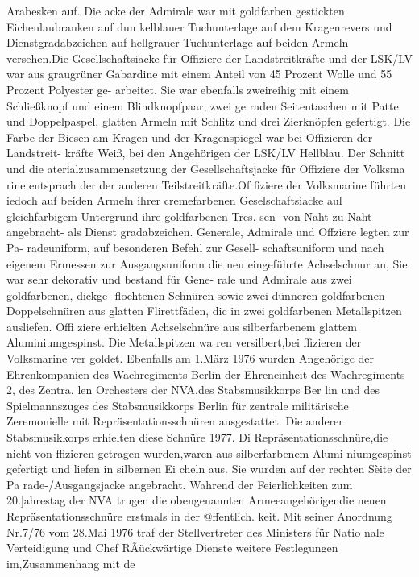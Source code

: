 Arabesken auf. Die acke der Admirale war mit
goldfarben gestickten Eichenlaubranken auf dun
kelblauer Tuchunterlage auf dem Kragenrevers und
Dienstgradabzeichen auf hellgrauer Tuchunterlage
auf beiden Armeln versehen.Die Gesellschaftsiacke
für Offiziere der Landstreitkräfte und der LSK/LV
war aus graugrüner Gabardine mit einem Anteil
von 45 Prozent Wolle und 55 Prozent Polyester ge-
arbeitet. Sie war ebenfalls zweireihig mit einem
Schließknopf und einem Blindknopfpaar, zwei ge
raden Seitentaschen mit Patte und Doppelpaspel,
glatten Armeln mit Schlitz und drei Zierknöpfen
gefertigt. Die Farbe der Biesen am Kragen und der
Kragenspiegel war bei Offizieren der Landstreit-
kräfte Weiß, bei den Angehörigen der LSK/LV
Hellblau.
Der Schnitt und die aterialzusammensetzung
der Gesellschaftsjacke für Offiziere der Volksma
rine entsprach der der anderen Teilstreitkräfte.Of
fiziere der Volksmarine führten iedoch auf beiden
Armeln ihrer cremefarbenen Geselschaftsiacke aul
gleichfarbigem Untergrund ihre goldfarbenen Tres.
sen -von Naht zu Naht angebracht- als Dienst
gradabzeichen.
Generale, Admirale und Offziere legten zur Pa-
radeuniform, auf besonderen Befehl zur Gesell-
schaftsuniform und nach eigenem Ermessen zur
Ausgangsuniform die neu eingeführte Achselschnur
an, Sie war sehr dekorativ und bestand für Gene-
rale und Admirale aus zwei goldfarbenen, dickge-
flochtenen Schnüren sowie zwei dünneren goldfarbenen Doppelschnüren aus glatten Flirettfäden, dic
in zwei goldfarbenen Metallspitzen ausliefen. Offi
ziere erhielten Achselschnüre aus silberfarbenem
glattem Aluminiumgespinst. Die Metallspitzen wa
ren versilbert,bei ffizieren der Volksmarine ver
goldet.
Ebenfalls am 1.März 1976 wurden Angehörigc
der Ehrenkompanien des Wachregiments Berlin
der Ehreneinheit des Wachregiments 2, des Zentra.
len Orchesters der NVA,des Stabsmusikkorps Ber
lin und des Spielmannszuges des Stabsmusikkorps
Berlin für zentrale militärische Zeremonielle mit
Repräsentationsschnüren ausgestattet. Die anderer
Stabsmusikkorps erhielten diese Schnüre 1977. Di
Repräsentationsschnüre,die nicht von ffizieren
getragen wurden,waren aus silberfarbenem Alumi
niumgespinst gefertigt und liefen in silbernen Ei
cheln aus. Sie wurden auf der rechten Sèite der Pa
rade-/Ausgangsjacke angebracht. Wahrend der
Feierlichkeiten zum 20.]ahrestag der NVA trugen
die obengenannten Armeeangehörigendie neuen
Repräsentationsschnüre erstmals in der @ffentlich.
keit.
Mit seiner Anordnung Nr.7/76 vom 28.Mai
1976 traf der Stellvertreter des Ministers für Natio
nale Verteidigung und Chef RÃückwärtige Dienste
weitere Festlegungen im,Zusammenhang mit de
